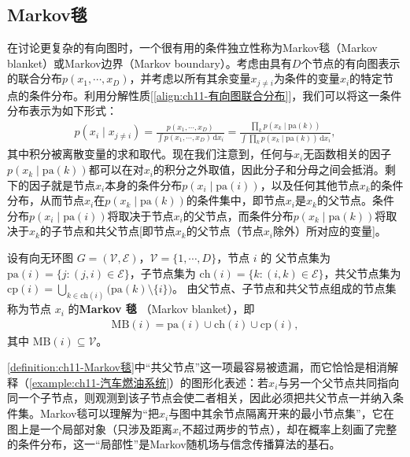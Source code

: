 \documentclass[../../main.tex]{subfiles}
\begin{document}
\subsection{Markov毯}\label{subsection:ch11-Markov毯}

在讨论更复杂的有向图时，一个很有用的条件独立性称为Markov毯（Markov blanket）或Markov边界（Markov boundary）。考虑由具有$D$个节点的有向图表示的联合分布$p(x_1,\cdots,x_D)$，并考虑以所有其余变量$x_{j\neq i}$为条件的变量$x_i$的特定节点的条件分布。利用分解性质[\eqref{align:ch11-有向图联合分布}]，我们可以将这一条件分布表示为如下形式：
\begin{align*}
  p(x_i\mid x_{j\neq i}) = \frac{p(x_1,\cdots,x_D)}{\int p(x_1,\cdots,x_D)\,\mathrm{d}x_i} = \frac{\prod_k p(x_k\mid \mathrm{pa}(k))}{\int\prod_k p(x_k\mid \mathrm{pa}(k))\,\mathrm{d}x_i},
\end{align*}
其中积分被离散变量的求和取代。现在我们注意到，任何与$x_i$无函数相关的因子$p(x_k\mid \mathrm{pa}(k))$都可以在对$x_i$的积分之外取值，因此分子和分母之间会抵消。剩下的因子就是节点$x_i$本身的条件分布$p(x_i\mid \mathrm{pa}(i))$，以及任何其他节点$x_k$的条件分布，从而节点$x_i$在$p(x_k\mid \mathrm{pa}(k))$的条件集中，即节点$x_i$是$x_k$的父节点。条件分布$p(x_i\mid \mathrm{pa}(i))$将取决于节点$x_i$的父节点，而条件分布$p(x_k\mid \mathrm{pa}(k))$将取决于$x_k$的子节点和共父节点[即节点$x_k$的父节点（节点$x_i$除外）所对应的变量]。

\begin{definition}[Markov 毯]\label{definition:ch11-Markov毯}
设有向无环图 $G=(\mathcal{V},\mathcal{E})$，$\mathcal{V}=\{1,\cdots,D\}$，节点 $i$ 的
父节点集为 $\mathrm{pa}(i)=\{j:(j,i)\in\mathcal{E}\}$，子节点集为
$\mathrm{ch}(i)=\{k:(i,k)\in\mathcal{E}\}$，共父节点集为
$\mathrm{cp}(i)=\bigcup_{k\in\mathrm{ch}(i)}\bigl(\mathrm{pa}(k)\setminus\{i\}\bigr)$。
由父节点、子节点和共父节点组成的节点集称为节点 $x_i$ 的\textbf{Markov 毯}
（Markov blanket），即
\begin{align}
  \mathrm{MB}(i) = \mathrm{pa}(i)\cup \mathrm{ch}(i)\cup \mathrm{cp}(i),
  \label{align:ch11-Markov毯定义}
\end{align}
其中 $\mathrm{MB}(i)\subseteq\mathcal{V}$。
\end{definition}

\begin{remark}
\cref{definition:ch11-Markov毯}中“共父节点”这一项最容易被遗漏，而它恰恰是相消解释（\cref{example:ch11-汽车燃油系统}）的图形化表述：若$x_i$与另一个父节点共同指向同一个子节点，则观测到该子节点会使二者相关，因此必须把共父节点一并纳入条件集。Markov毯可以理解为“把$x_i$与图中其余节点隔离开来的最小节点集”，它在图上是一个局部对象（只涉及距离$x_i$不超过两步的节点），却在概率上刻画了完整的条件分布，这一“局部性”是Markov随机场与信念传播算法的基石。
\end{remark}
\end{document}
